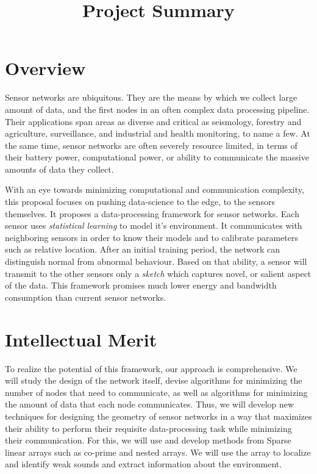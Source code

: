 \documentclass{article}
\title{Project Summary}
\begin{document}
\section{Overview}
Sensor networks are ubiquitous. They are the means by which we collect large amount of data, and the first nodes in an often complex data processing pipeline. Their applications span areas as diverse and critical as seismology, forestry and agriculture, surveillance, and industrial and health monitoring, to name a few. At the same time, sensor networks are often severely resource limited, in terms of their battery power, computational power, or ability to communicate the massive amounts of data they collect.

With an eye towards minimizing computational and communication complexity, this proposal focuses on pushing data-science to the edge, to the sensors themselves.  It proposes a data-processing framework for sensor networks. Each sensor uses {\em
  statistical learning} to model it's environment. It communicates
with neighboring sensors in order to know their models and to
calibrate parameters such as relative location. After an initial
training period, the network can distinguish normal from abnormal
behaviour. Based on that ability, a sensor will transmit to the other
sensors only a {\em sketch} which captures  novel, or
salient aspect of the data. This framework promises much lower energy and bandwidth
consumption than current sensor networks. 

\section{Intellectual Merit}
 To realize the potential of this framework, 
 our approach is comprehensive. We will study the design of the network itself, devise algorithms for minimizing the number of nodes that need to communicate, as well as algorithms for minimizing the amount of data that each node communicates. 
Thus, we will develop new techniques for designing the geometry of sensor networks in a way that maximizes their ability to perform their requisite data-processing task while minimizing their communication. For this, we will use and develop methods from Sparse linear arrays such as co-prime and nested arrays.
We will use the array to localize and identify weak sounds and extract information about the environment. 
\end{document}
